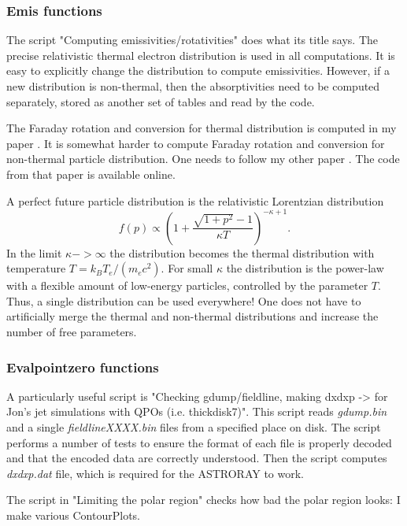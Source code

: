 \documentclass{emulateapj}
\begin{document}
\subsubsection{Emis functions}
The script "Computing emissivities/rotativities" does what its title says. The precise relativistic thermal electron distribution is used in all computations.
It is easy to explicitly change the distribution to compute emissivities. However, if a new distribution is non-thermal, 
then the absorptivities need to be computed separately, stored as another set of tables and read by the code.

The Faraday rotation and conversion for thermal distribution is computed in my paper \citep{Shcherbakov:2008fa}.
It is somewhat harder to compute Faraday rotation and conversion for non-thermal particle distribution.
One needs to follow my other paper \citet{Huang:2011de}. The code from that paper is available online.

A perfect future particle distribution is the relativistic Lorentzian distribution \citep{Shcherbakov:2009po}
\begin{equation}
f(p)\propto\left(1+\frac{\sqrt{1+p^2}-1}{\kappa T}\right)^{-\kappa+1}.
\end{equation} In the limit $\kappa->\infty$ the distribution becomes the thermal distribution with temperature $T=k_B T_e/(m_e c^2)$.
For small $\kappa$ the distribution is the power-law with a flexible amount of low-energy particles, controlled by the parameter $T$.
Thus, a single distribution can be used everywhere! One does not have to artificially merge the thermal and non-thermal distributions and increase the number of free parameters.

\subsubsection{Evalpointzero functions}
A particularly useful script is "Checking gdump/fieldline, making dxdxp -> for Jon's jet simulations with QPOs (i.e. thickdisk7)". This script reads \textit{gdump.bin} and a single \textit{fieldlineXXXX.bin} files from a specified place on disk.
The script performs a number of tests to ensure the format of each file is properly decoded and that the encoded data are correctly understood.
Then the script computes \textit{dxdxp.dat} file, which is required for the ASTRORAY to work.

The script in "Limiting the polar region" checks how bad the polar region looks: I make various ContourPlots.





\end{document}

